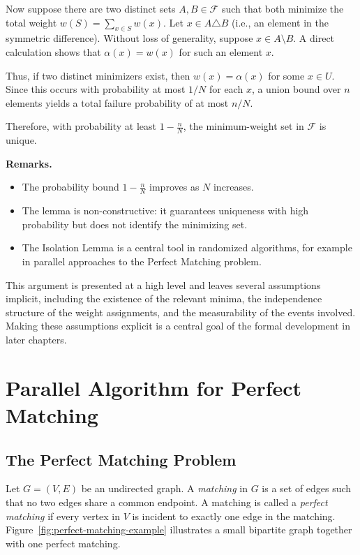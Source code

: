 Now suppose there are two distinct sets $A, B \in \mathcal{F}$ such that both minimize the total weight $w(S) = \sum_{x \in S} w(x)$.
Let $x \in A \triangle B$ (i.e., an element in the symmetric difference). Without loss of generality, suppose $x \in A \setminus B$.
A direct calculation shows that $\alpha(x) = w(x)$ for such an element $x$.

Thus, if two distinct minimizers exist, then $w(x) = \alpha(x)$ for some $x \in U$.
Since this occurs with probability at most $1/N$ for each $x$, a union bound over $n$ elements yields a total failure probability of at most $n/N$.

Therefore, with probability at least $1 - \frac{n}{N}$, the minimum-weight set in $\mathcal{F}$ is unique.

\vspace{0.5cm}
\noindent
\textbf{Remarks.}
\begin{itemize}
    \item The probability bound $1 - \frac{n}{N}$ improves as $N$ increases.
    \item The lemma is non-constructive: it guarantees uniqueness with high probability but does not identify the minimizing set.
    \item The Isolation Lemma is a central tool in randomized algorithms, for example in parallel approaches to the Perfect Matching problem.
\end{itemize}

This argument is presented at a high level and leaves several assumptions implicit, including the existence of the relevant minima, the independence structure of the weight assignments, and the measurability of the events involved.
Making these assumptions explicit is a central goal of the formal development in later chapters.


\section{Parallel Algorithm for Perfect Matching}

\subsection{The Perfect Matching Problem}
\label{subsec:perfect-matching-problem}

Let $G = (V,E)$ be an undirected graph.
A \emph{matching} in $G$ is a set of edges such that no two edges share a common endpoint.
A matching is called a \emph{perfect matching} if every vertex in $V$ is incident to exactly one edge in the matching.
Figure~\ref{fig:perfect-matching-example} illustrates a small bipartite graph together with one perfect matching.

